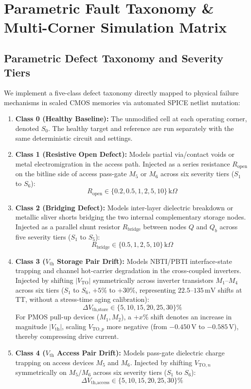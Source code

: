\documentclass[conference]{IEEEtran}
\begin{document}
\section{Parametric Fault Taxonomy \& Multi-Corner Simulation Matrix}
\label{sec:faults}

\subsection{Parametric Defect Taxonomy and Severity Tiers}
We implement a five-class defect taxonomy directly mapped to physical failure mechanisms in scaled CMOS memories via automated SPICE netlist mutation:
\begin{enumerate}
    \item \textbf{Class 0 (Healthy Baseline):} The unmodified cell at each operating corner, denoted $S_0$. The healthy target and reference are run separately with the same deterministic circuit and settings.
    \item \textbf{Class 1 (Resistive Open Defect):} Models partial via/contact voids or metal electromigration in the access path. Injected as a series resistance $R_{\text{open}}$ on the bitline side of access pass-gate $M_5$ or $M_6$ across six severity tiers ($S_1$ to $S_6$):
    \begin{equation}
    R_{\text{open}} \in \{0.2, 0.5, 1, 2, 5, 10\}\,\text{k}\Omega
    \end{equation}
    \item \textbf{Class 2 (Bridging Defect):} Models inter-layer dielectric breakdown or metallic sliver shorts bridging the two internal complementary storage nodes. Injected as a parallel shunt resistor $R_{\text{bridge}}$ between nodes $Q$ and $Q_b$ across five severity tiers ($S_1$ to $S_5$):
    \begin{equation}
    R_{\text{bridge}} \in \{0.5, 1, 2, 5, 10\}\,\text{k}\Omega
    \end{equation}
    \item \textbf{Class 3 ($V_{\text{th}}$ Storage Pair Drift):} Models NBTI/PBTI interface-state trapping and channel hot-carrier degradation in the cross-coupled inverters. Injected by shifting $|V_{\text{TO}}|$ symmetrically across inverter transistors $M_1$--$M_4$ across six tiers ($S_1$ to $S_6$, $+5\%$ to $+30\%$, representing $22.5\text{--}135\,\text{mV}$ shifts at TT, without a stress-time aging calibration):
    \begin{equation}
    \Delta V_{\text{th,store}} \in \{5,10,15,20,25,30\}\%
    \end{equation}
    For PMOS pull-up devices ($M_1, M_2$), a $+x\%$ shift denotes an increase in magnitude $|V_{\text{th}}|$, scaling $V_{\text{TO},p}$ more negative (from $-0.450\,\text{V}$ to $-0.585\,\text{V}$), thereby compressing drive current.
    \item \textbf{Class 4 ($V_{\text{th}}$ Access Pair Drift):} Models pass-gate dielectric charge trapping on access devices $M_5$ and $M_6$. Injected by shifting $V_{\text{TO},n}$ symmetrically on $M_5/M_6$ across six severity tiers ($S_1$ to $S_6$):
    \begin{equation}
    \Delta V_{\text{th,access}} \in \{5,10,15,20,25,30\}\%
    \end{equation}
\end{enumerate}
\end{document}
